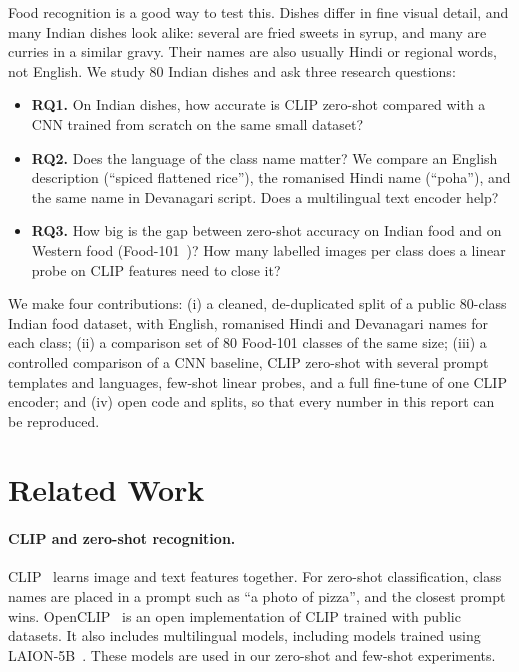 \documentclass[twoside,a4paper,11pt]{article}
\begin{document}
Food recognition is a good way to test this. Dishes differ in fine visual detail, and many Indian dishes look alike:
several are fried sweets in syrup, and many are curries in a similar gravy. Their names are also usually Hindi or
regional words, not English. We study 80 Indian dishes and ask three research questions:
\begin{itemize}
  \item \textbf{RQ1.} On Indian dishes, how accurate is CLIP zero-shot compared with a CNN trained from scratch on
        the same small dataset?
  \item \textbf{RQ2.} Does the language of the class name matter? We compare an English description
        (``spiced flattened rice''), the romanised Hindi name (``poha''), and the same name in Devanagari script.
        Does a multilingual text encoder help?
  \item \textbf{RQ3.} How big is the gap between zero-shot accuracy on Indian food and on Western food
        (Food-101~\cite{bossard2014food101})? How many labelled images per class does a linear probe on CLIP
        features need to close it?
\end{itemize}

We make four contributions: (i) a cleaned, de-duplicated split of a public 80-class Indian food dataset, with
English, romanised Hindi and Devanagari names for each class; (ii) a comparison set of 80 Food-101 classes of the
same size; (iii) a controlled comparison of a CNN baseline, CLIP zero-shot with several prompt templates and
languages, few-shot linear probes, and a full fine-tune of one CLIP encoder; and (iv) open code and splits, so that
every number in this report can be reproduced.

\section{Related Work}
\paragraph{CLIP and zero-shot recognition.} CLIP~\cite{radford2021clip} learns image and text features together. For zero-shot classification, class names are placed in a prompt such as ``a photo of pizza'', and the closest prompt wins. OpenCLIP~\cite{cherti2023openclip} is an open implementation of CLIP trained with public datasets. It also includes multilingual models, including models trained using LAION-5B~\cite{schuhmann2022laion5b}. These models are used in our zero-shot and few-shot experiments.
\end{document}
